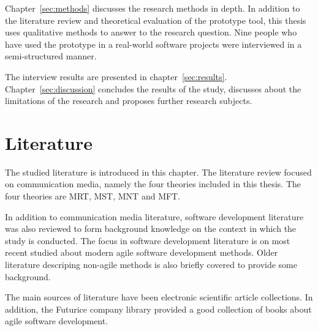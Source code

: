 \documentclass[english,12pt,a4paper,pdftex]{article}
\begin{document}
Chapter~\ref{sec:methods} discusses the research methods in depth. In addition to the literature review and theoretical evaluation of the prototype tool, this thesis uses qualitative methods to answer to the research question. Nine people who have used the prototype in a real-world software projects were interviewed in a semi-structured manner.

The interview results are presented in chapter~\ref{sec:results}. Chapter~\ref{sec:discussion} concludes the results of the study, discusses about the limitations of the research and proposes further research subjects.


\thispagestyle{empty}


\clearpage

\section{Literature}
\label{sec:literature}
\acresetall

The studied literature is introduced in this chapter. The literature review focused on communication media, namely the four theories included in this thesis. The four theories are \ac{MRT}, \ac{MST}, \ac{MNT} and \ac{MFT}.

In addition to communication media literature, software development literature was also reviewed to form background knowledge on the context in which the study is conducted. The focus in software development literature is on most recent studied about modern agile software development methods. Older literature descriping non-agile methods is also briefly covered to provide some background.

The main sources of literature have been electronic scientific article collections. In addition, the Futurice company library provided a good collection of books about agile software development.

\end{document}
